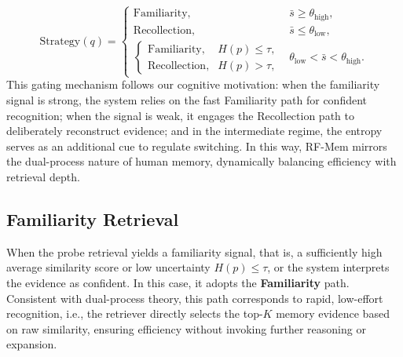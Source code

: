 \begin{equation}
\text{Strategy}(q) =
\begin{cases}
\text{Familiarity}, & \bar{s} \geq \theta_{\text{high}}, \\[6pt]
\text{Recollection}, & \bar{s} \leq \theta_{\text{low}}, \\[6pt]
\begin{cases}
\text{Familiarity}, & H(p) \leq \tau, \\
\text{Recollection}, & H(p) > \tau,
\end{cases} & \theta_{\text{low}} < \bar{s} < \theta_{\text{high}}.
\end{cases}
\end{equation}
This gating mechanism follows our cognitive motivation: 
when the familiarity signal is strong, the system relies on the fast Familiarity path for confident recognition; 
when the signal is weak, it engages the Recollection path to deliberately reconstruct evidence; 
and in the intermediate regime, the entropy serves as an additional cue to regulate switching. 
In this way, RF-Mem mirrors the dual-process nature of human memory, dynamically balancing efficiency with retrieval depth.

\subsection{Familiarity Retrieval}
\label{sec:FR}
When the probe retrieval yields a familiarity signal, that is, a sufficiently high average similarity score or low uncertainty $H(p) \leq \tau$, or the system interprets the evidence as confident. In this case, it adopts the \textbf{Familiarity} path. Consistent with dual-process theory, this path corresponds to rapid, low-effort recognition, i.e., the retriever directly selects the top-$K$ memory evidence based on raw similarity, ensuring efficiency without invoking further reasoning or expansion.

